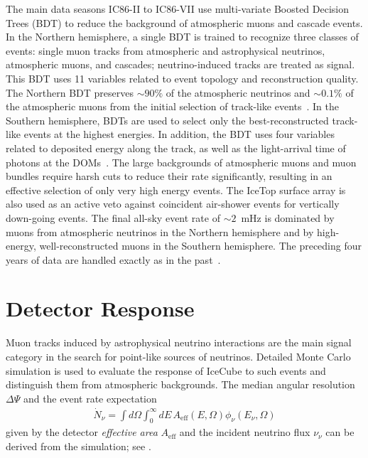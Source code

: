 \documentclass[aps,10pt,prd,twocolumn,floats,letterpaper,showpacs,nofootinbib,bibnotes,notitlepage,superscriptaddress,floatfix]{revtex4-1}
\newcommand{\MA}[1]{{\color{black}#1}}
\begin{document}
The main data seasons IC86-II to IC86-VII use multi-variate Boosted Decision Trees (BDT) to reduce the background of atmospheric muons and cascade events. In the Northern hemisphere, a single BDT is trained to recognize three classes of events: single muon tracks from atmospheric and astrophysical neutrinos, atmospheric muons, and cascades; neutrino-induced tracks are treated as signal. This BDT uses 11 variables related to event topology and reconstruction quality. The Northern BDT preserves $\sim90\%$ of the atmospheric neutrinos and $\sim0.1\%$ of the atmospheric muons from the initial selection of track-like events~\cite{Aartsen:2016oji,Aartsen:2018ywr,Aartsen:2019fau}. In the Southern hemisphere, BDTs are used to select only the best-reconstructed track-like events at the highest energies. In addition, the BDT uses four variables related to deposited energy along the track, as well as the light-arrival time of photons at the DOMs~\cite{Aartsen:2014cva,Aartsen:2016oji}. The large backgrounds of atmospheric muons and muon bundles require harsh cuts to reduce their rate significantly, resulting in an effective selection of only very high energy events. The IceTop surface array is also used as an active veto against coincident air-shower events for vertically down-going events. The final all-sky event rate of $\sim2$~mHz is dominated by muons from atmospheric neutrinos in the Northern hemisphere and by high-energy, well-reconstructed muons in the Southern hemisphere. The preceding four years of data are handled exactly as in the past~\cite{Abbasi:2010rd,Aartsen:2013uuv,Schatto:2014kbj,Aartsen:2014cva}.



\section{Detector Response}\label{secIII}

Muon tracks induced by astrophysical neutrino interactions are the main signal category in the search for point-like sources of neutrinos. Detailed Monte Carlo simulation is used to evaluate the response of IceCube to such events and distinguish them from atmospheric backgrounds. The median angular resolution $\Delta\Psi$ and the event rate expectation
\begin{align}\label{eq:ev_rate}
\dot{N}_\nu=\int d\Omega\int_0^\infty dE\,A_\mathrm{eff}\left(E, \Omega\right) \phi_\nu\left(E_\nu,\Omega\right)
\end{align}
given by the detector \emph{effective area} $A_\mathrm{eff}$ and the incident neutrino flux $\nu_\nu$ can be derived from the simulation; see \cite{Aartsen:2016xlq}.
\end{document}
